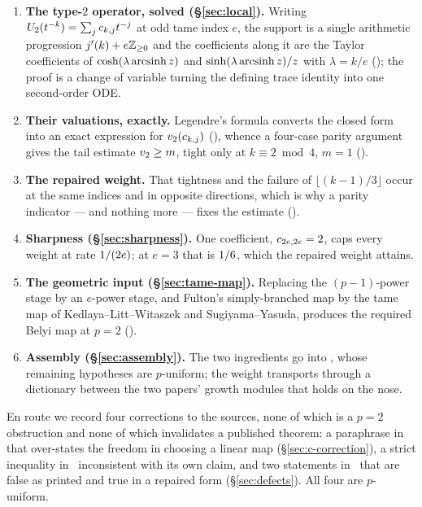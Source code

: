 \begin{enumerate}[label=(\arabic*),leftmargin=*,itemsep=2pt]
\item \textbf{The type-$2$ operator, solved (\S\ref{sec:local}).} Writing
  $U_2(t^{-k}) = \sum_j c_{k,j}t^{-j}$ at odd tame index $e$, the support
  is a single arithmetic progression $j'(k) + e\mathbb{Z}_{\ge 0}$ and the
  coefficients along it are the Taylor coefficients of $\cosh(\lambda
  \operatorname{arcsinh} z)$ and $\sinh(\lambda\operatorname{arcsinh} z)/z$ with $\lambda = k/e$
  (); the proof is a change of variable turning the
  defining trace identity into one second-order ODE\@.
\item \textbf{Their valuations, exactly.} Legendre's formula converts the
  closed form into an exact expression for $v_2(c_{k,j})$
  (), whence a four-case parity argument gives the tail
  estimate $v_2 \ge m$, tight only at $k \equiv 2 \bmod 4$, $m = 1$
  ().
\item \textbf{The repaired weight.} That tightness and the failure of
  $\lfloor (k-1)/3 \rfloor$ occur at the same indices and in opposite
  directions, which is why a parity indicator --- and nothing more --- fixes
  the estimate ().
\item \textbf{Sharpness (\S\ref{sec:sharpness}).} One coefficient,
  $c_{2e,2e} = 2$, caps every weight at rate $1/(2e)$;
  at $e = 3$ that is $1/6$, which the repaired weight attains.
\item \textbf{The geometric input (\S\ref{sec:tame-map}).} Replacing the
  $(p-1)$-power stage by an $e$-power stage, and Fulton's simply-branched
  map by the tame map of Kedlaya--Litt--Witaszek and Sugiyama--Yasuda,
  produces the required Belyi map at $p = 2$ ().
\item \textbf{Assembly (\S\ref{sec:assembly}).} The two ingredients go into
  \cite{kramermiller2020abelian}, whose remaining hypotheses are
  $p$-uniform; the weight transports through a dictionary between the two
  papers' growth modules that holds on the nose.
\end{enumerate}

En route we record four corrections to the sources, none of which is a $p =
2$ obstruction and none of which invalidates a published theorem: a
paraphrase in~\cite{kramermillerupton2021newton} that over-states the freedom in
choosing a linear map (\S\ref{sec:c-correction}), a strict inequality in~\cite[Definition~6.3]{kramermillerupton2021newton} inconsistent with its own claim,
and two statements in~\cite[\S4.1]{kramermiller2020abelian} that are false
as printed and true in a repaired form (\S\ref{sec:defects}). All four are
$p$-uniform.

